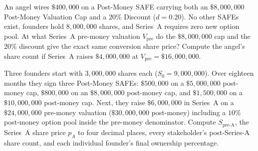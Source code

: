 \begin{exercise}
An angel wires $\$400{,}000$ on a Post-Money SAFE carrying both an $\$8{,}000{,}000$ Post-Money Valuation Cap and a $20\%$ Discount ($d = 0.20$). No other SAFEs exist, founders hold $8{,}000{,}000$ shares, and Series~A requires zero new option pool. At what Series~A pre-money valuation $V_{\text{pre}}$ do the $\$8{,}000{,}000$ cap and the $20\%$ discount give the exact same conversion share price? Compute the angel's share count if Series~A raises $\$4{,}000{,}000$ at $V_{\text{pre}} = \$16{,}000{,}000$.
\end{exercise}

\begin{exercise}
Three founders start with $3{,}000{,}000$ shares each ($S_0 = 9{,}000{,}000$). Over eighteen months they sign three Post-Money SAFEs: $\$500{,}000$ on a $\$5{,}000{,}000$ post-money cap, $\$800{,}000$ on an $\$8{,}000{,}000$ post-money cap, and $\$1{,}500{,}000$ on a $\$10{,}000{,}000$ post-money cap. Next, they raise $\$6{,}000{,}000$ in Series~A on a $\$24{,}000{,}000$ pre-money valuation ($\$30{,}000{,}000$ post-money) including a $10\%$ post-money option pool inside the pre-money denominator. Compute $S_{\text{pre-A}}$, the Series~A share price $p_A$ to four decimal places, every stakeholder's post-Series-A share count, and each individual founder's final ownership percentage.
\end{exercise}
